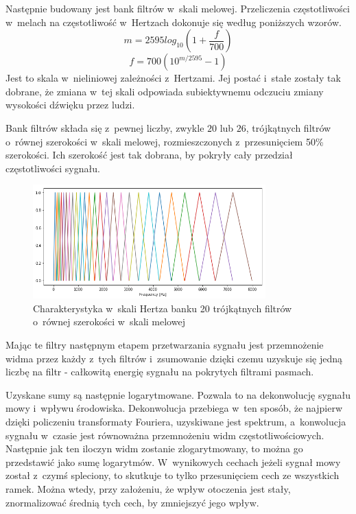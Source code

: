 Następnie budowany jest bank filtrów w~skali melowej. Przeliczenia częstotliwości w~melach na
częstotliwość w~Hertzach dokonuje się według poniższych wzorów.
$$m = 2595 log_{10}(1 + \frac{f}{700})$$
$$f = 700 (10^{m/2595} - 1)$$
Jest to skala w~nieliniowej zależności z~Hertzami. Jej postać i~stałe zostały tak dobrane,
że zmiana w~tej skali odpowiada subiektywnemu odczuciu zmiany wysokości dźwięku przez ludzi.

Bank filtrów składa się z~pewnej liczby, zwykle $20$ lub $26$, trójkątnych filtrów o~równej
szerokości w~skali melowej, rozmieszczonych z~przesunięciem 50\% szerokości. Ich szerokość
jest tak dobrana, by pokryły cały przedział częstotliwości sygnału.

\begin{figure}[H]
    \centering
    \includegraphics[width=0.8\textwidth]{images/2_1_d_mel_filters}
    \caption{Charakterystyka w~skali Hertza banku 20 trójkątnych filtrów o~równej szerokości w~skali melowej}
    \label{fig:2_1_d_mel_filters}
\end{figure}

Mając te filtry następnym etapem przetwarzania sygnału jest przemnożenie widma przez każdy z~tych filtrów i~zsumowanie
dzięki czemu uzyskuje się jedną liczbę na filtr - całkowitą energię sygnału na pokrytych filtrami pasmach.

Uzyskane sumy są następnie logarytmowane. Pozwala to na dekonwolucję sygnału mowy i~wpływu środowiska.
Dekonwolucja przebiega w~ten sposób, że najpierw dzięki policzeniu transformaty Fouriera,
uzyskiwane jest spektrum, a~konwolucja sygnału w~czasie jest równoważna przemnożeniu widm częstotliwościowych.
Następnie jak ten iloczyn widm zostanie zlogarytmowany, to można go przedstawić jako sumę logarytmów.
W~wynikowych cechach jeżeli sygnał mowy został z~czymś spleciony, to skutkuje to tylko przesunięciem cech
ze wszystkich ramek. Można wtedy, przy założeniu, że wpływ otoczenia jest stały, znormalizować średnią tych cech,
by zmniejszyć jego wpływ.

